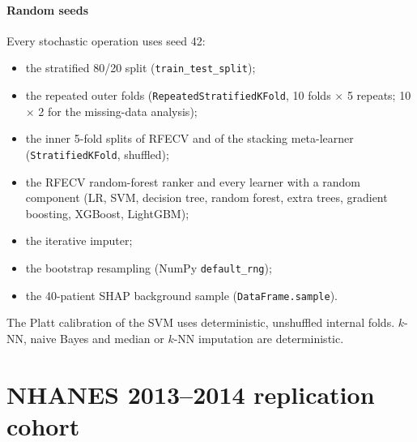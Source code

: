 \documentclass[11pt]{article}
\begin{document}
\paragraph{Random seeds} Every stochastic operation uses seed 42:
\begin{itemize}
  \item the stratified 80/20 split (\texttt{train\_test\_split});
  \item the repeated outer folds (\texttt{RepeatedStratifiedKFold}, 10 folds $\times$ 5 repeats; 10 $\times$ 2 for the missing-data analysis);
  \item the inner 5-fold splits of RFECV and of the stacking meta-learner (\texttt{StratifiedKFold}, shuffled);
  \item the RFECV random-forest ranker and every learner with a random component (LR, SVM, decision tree, random forest, extra trees, gradient boosting, XGBoost, LightGBM);
  \item the iterative imputer;
  \item the bootstrap resampling (NumPy \texttt{default\_rng});
  \item the 40-patient SHAP background sample (\texttt{DataFrame.sample}).
\end{itemize}
The Platt calibration of the SVM uses deterministic, unshuffled internal folds. $k$-NN, naive Bayes and median or $k$-NN imputation are deterministic.

\section{NHANES 2013--2014 replication cohort}
\end{document}
